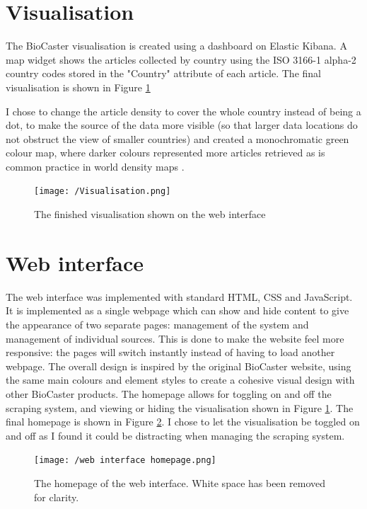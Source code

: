 \documentclass{l4proj}
\begin{document}
\section{Visualisation}
The BioCaster visualisation is created using a dashboard on Elastic Kibana. A map widget shows the articles collected by country using the ISO 3166-1 alpha-2 country codes stored in the "Country" attribute of each article. The final visualisation is shown in Figure \ref{fig:visualisation}

I chose to change the article density to cover the whole country instead of being a dot, to make the source of the data more visible (so that larger data locations do not obstruct the view of smaller countries) and created a monochromatic green colour map, where darker colours represented more articles retrieved as is common practice in world density maps \citep{ourworldindata_density, ons_density}.

\begin{figure}[h]
\texttt{[image: /Visualisation.png]}
\caption{The finished visualisation shown on the web interface}
\label{fig:visualisation}
\end{figure}


\section{Web interface}
The web interface was implemented with standard HTML, CSS and JavaScript. It is implemented as a single webpage which can show and hide content to give the appearance of two separate pages: management of the system and management of individual sources. This is done to make the website feel more responsive: the pages will switch instantly instead of having to load another webpage. The overall design is inspired by the original BioCaster website, using the same main colours and element styles to create a cohesive visual design with other BioCaster products. The homepage allows for toggling on and off the scraping system, and viewing or hiding the visualisation shown in Figure \ref{fig:visualisation}. The final homepage is shown in Figure \ref{fig:web-interface-homepage}. I chose to let the visualisation be toggled on and off as I found it could be distracting when managing the scraping system.
\begin{figure}[h]
\centering
\texttt{[image: /web interface homepage.png]}
\caption{The homepage of the web interface. White space has been removed for clarity.}
\label{fig:web-interface-homepage}
\end{figure}
\end{document}
